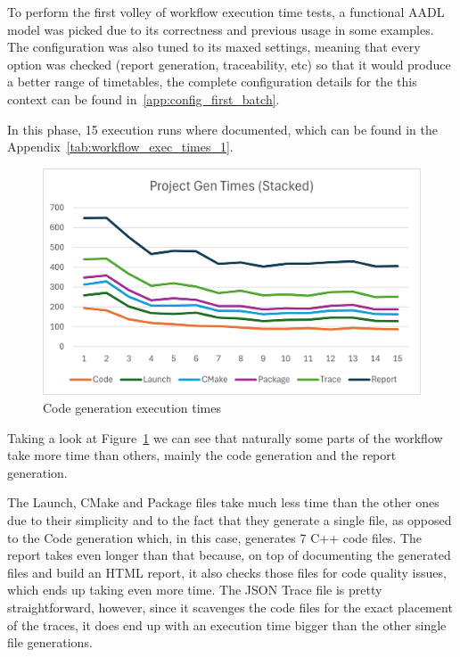 To perform the first volley of workflow execution time tests, a functional \gls{AADL} model was picked due to its correctness and previous usage in some examples. The configuration was also tuned to its maxed settings, meaning that every option was checked (report generation, traceability, etc) so that it would produce a better range of timetables, the complete configuration details for the this context can be found in~\ref{app:config_first_batch}.

In this phase, 15 execution runs where documented, which can be found in the Appendix~\ref{tab:workflow_exec_times_1}.

\begin{figure}[htbp]
	\centering
	\includegraphics[width=\textwidth]{exec_times1.png}
	\caption{Code generation execution times}
	\label{fig:exec_times_1}
\end{figure}

Taking a look at Figure~\ref{fig:exec_times_1} we can see that naturally some parts of the workflow take more time than others, mainly the code generation and the report generation.

The Launch, CMake and Package files take much less time than the other ones due to their simplicity and to the fact that they generate a single file, as opposed to the Code generation which, in this case, generates 7 C++ code files. The report takes even longer than that because, on top of documenting the generated files and build an HTML report, it also checks those files for code quality issues, which ends up taking even more time. The JSON Trace file is pretty straightforward, however, since it scavenges the code files for the exact placement of the traces, it does end up with an execution time bigger than the other single file generations.

